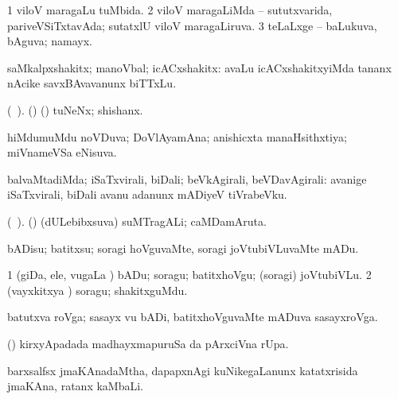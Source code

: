 {{{{{{\bentry
{}
  \gl{\nA}\bmng
{} 
\emng
\eentry

\bentry
{}
  \gl{\gu}\bmng
\bnum
\num{1} viloV maragaLu tuMbida. 
\num{2} viloV maragaLiMda -- sututxvarida, pariveVSiTxtavAda; sutatxlU viloV maragaLiruva. 
\num{3} teLaLxge -- baLukuva, bAguva; namayx. 
\enum
\emng
\eentry

\bentry
{}
  \gl{\nA}\bmng
saMkalpxshakitx; manoVbal; icACxshakitx:  avaLu icACxshakitxyiMda tananx nAcike savxBAvavanunx biTTxLu. 
\emng
\eentry

\bentry
{}
  \gl{\nA} (\bava\ ). \bmng
(\birx) (\ashi) tuNeNx; shishanx. 
\emng
\eentry

\bentry
{}
  \gl{\gu}\bmng
hiMdumuMdu noVDuva; DoVlAyamAna; anishicxta manaHsithxtiya; miVnameVSa eNisuva. 
\emng
\eentry

\bentry
{}
 \gl{\kirxvi}
\bmng
balvaMtadiMda; iSaTxvirali, biDali; beVkAgirali, beVDavAgirali:  avanige iSaTxvirali, biDali avanu adanunx mADiyeV tiVrabeVku. 
\emng
\eentry

\bentry
{}
  \gl{\nA} (\bava\ ). \bmng
(\AseTxrXV) (dULebibxsuva) suMTragALi; caMDamAruta. 
\emng
\eentry

\bentry
{} 
\gl{\sakirx}
\expl{}
\bmng
bADisu; batitxsu; soragi hoVguvaMte, soragi joVtubiVLuvaMte mADu. 
\emng

\noindent
\gl{\akirx}
\expl{}
\bmng
\bnum
\num{1} (giDa, ele, \mo vugaLa \vi) bADu; soragu; batitxhoVgu; (soragi) joVtubiVLu. 
\num{2} (vayxkitxya \vi) soragu; shakitxguMdu. 
\enum
\emng
\eentry

\bentry
{} 
\gl{\nA}
\expl{}
\bmng
batutxva roVga; sasayx \mo vu bADi, batitxhoVguvaMte mADuva sasayxroVga. 
\emng
\eentry

\bentry
{} 
\gl{\kirx}
\expl{}
\bmng
(\pArxparx)  kirxyApadada madhayxmapuruSa \Eva da pArxciVna rUpa. 
\emng
\eentry

\bentry
{}
  \gl{\nA}\bmng
barxsalfsx jmaKAnadaMtha, dapapxnAgi kuNikegaLanunx katatxrisida jmaKAna, ratanx kaMbaLi. 
\emng
\eentry

}}}}}}
